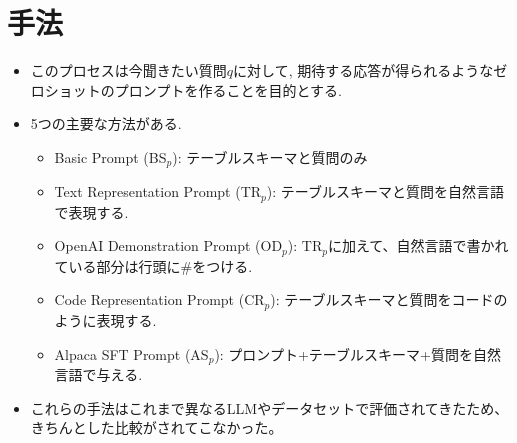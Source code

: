 \documentclass[dvipdfmx,uplatex]{jsarticle}
\theoremstyle{remark}
\newenvironment{method}[1]{
    \begin{tcolorbox}[
        colframe=green!50!black,
        colback=green!50!black!10!white,
        colbacktitle=green!50!black!40!white,
        coltitle=black,
        fonttitle=\bfseries,
        title={#1}
    ]
}{
    \end{tcolorbox}
}
\begin{document}
\section{手法}
\begin{method}{Question Representation (質問表現)}
\begin{itemize}
    \item このプロセスは今聞きたい質問$q$に対して, 期待する応答が得られるようなゼロショットのプロンプトを作ることを目的とする.
    \item 5つの主要な方法がある.
    \begin{itemize}
        \item Basic Prompt (BS${}_p$): テーブルスキーマと質問のみ
        \item Text Representation Prompt (TR${}_p$): テーブルスキーマと質問を自然言語で表現する.
        \item OpenAI Demonstration Prompt (OD${}_p$): TR${}_p$に加えて、自然言語で書かれている部分は行頭に$\#$をつける.
        \item Code Representation Prompt (CR${}_p$): テーブルスキーマと質問をコードのように表現する.
        \item Alpaca SFT Prompt (AS${}_p$): プロンプト+テーブルスキーマ+質問を自然言語で与える.
    \end{itemize}
    \item これらの手法はこれまで異なるLLMやデータセットで評価されてきたため、きちんとした比較がされてこなかった。
\end{itemize}
\end{method}
\end{document}
